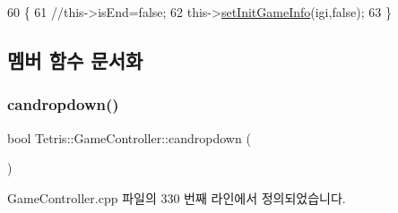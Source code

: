 \begin{DoxyCode}
60                                              \{
61                 \textcolor{comment}{//this->isEnd=false;}
62                 this->\hyperlink{class_tetris_1_1_game_controller_a0d835f535b48529ca536115dd8123099}{setInitGameInfo}(igi,\textcolor{keyword}{false});
63             \}
\end{DoxyCode}


\subsection{멤버 함수 문서화}
\mbox{\label{class_tetris_1_1_game_controller_ac4993d5ad8640ac617fec341fdb301ee}} 
\subsubsection{\texorpdfstring{candropdown()}{candropdown()}\hspace{0.1cm}{\footnotesize\ttfamily [1/2]}}
{\footnotesize\ttfamily bool Tetris\+::\+Game\+Controller\+::candropdown (\begin{DoxyParamCaption}{ }\end{DoxyParamCaption})}



Game\+Controller.\+cpp 파일의 330 번째 라인에서 정의되었습니다.


